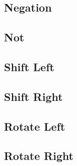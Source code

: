\documentclass{article}
\begin{document}
    \subsection{Negation}
    \subsection{Not}
    \subsection{Shift Left}
    \subsection{Shift Right}
    \subsection{Rotate Left}
    \subsection{Rotate Right}
\end{document}
